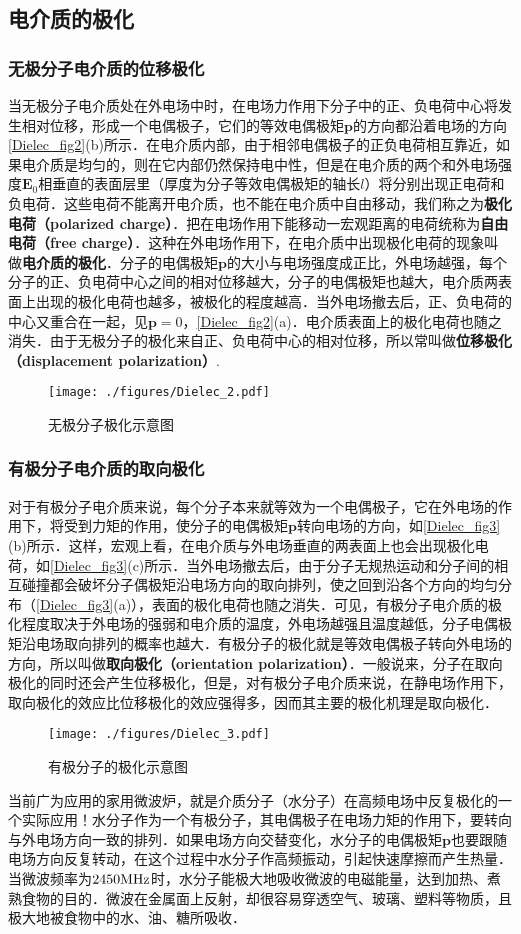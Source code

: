 \subsection{电介质的极化}

\subsubsection{无极分子电介质的位移极化}

当无极分子电介质处在外电场中时，在电场力作用下分子中的正、负电荷中心将发生相对位移，形成一个电偶极子，它们的等效电偶极矩$\mathbf p$的方向都沿着电场的方向\autoref{Dielec_fig2}(b)所示．在电介质内部，由于相邻电偶极子的正负电荷相互靠近，如果电介质是均匀的，则在它内部仍然保持电中性，但是在电介质的两个和外电场强度$\mathbf E_0$相垂直的表面层里（厚度为分子等效电偶极矩的轴长$l$）将分别出现正电荷和负电荷．这些电荷不能离开电介质，也不能在电介质中自由移动，我们称之为\textbf{极化电荷（polarized charge）}．把在电场作用下能移动一宏观距离的电荷统称为\textbf{自由电荷（free charge）}．这种在外电场作用下，在电介质中出现极化电荷的现象叫做\textbf{电介质的极化}．分子的电偶极矩$\mathbf p $的大小与电场强度成正比，外电场越强，每个分子的正、负电荷中心之间的相对位移越大，分子的电偶极矩也越大，电介质两表面上出现的极化电荷也越多，被极化的程度越高．当外电场撤去后，正、负电荷的中心又重合在一起，见$\mathbf p=0$，\autoref{Dielec_fig2}(a)．电介质表面上的极化电荷也随之消失．由于无极分子的极化来自正、负电荷中心的相对位移，所以常叫做\textbf{位移极化（displacement polarization）}.
\begin{figure}[ht]
\centering
\texttt{[image: ./figures/Dielec\_2.pdf]}
\caption{无极分子极化示意图} \label{Dielec_fig2}
\end{figure}

\subsubsection{有极分子电介质的取向极化}

对于有极分子电介质来说，每个分子本来就等效为一个电偶极子，它在外电场的作用下，将受到力矩的作用，使分子的电偶极矩$\mathbf p$转向电场的方向，如\autoref{Dielec_fig3}(b)所示．这样，宏观上看，在电介质与外电场垂直的两表面上也会出现极化电荷，如\autoref{Dielec_fig3}(c)所示．当外电场撤去后，由于分子无规热运动和分子间的相互碰撞都会破坏分子偶极矩沿电场方向的取向排列，使之回到沿各个方向的均匀分布（\autoref{Dielec_fig3}(a)），表面的极化电荷也随之消失．可见，有极分子电介质的极化程度取决于外电场的强弱和电介质的温度，外电场越强且温度越低，分子电偶极矩沿电场取向排列的概率也越大．有极分子的极化就是等效电偶极子转向外电场的方向，所以叫做\textbf{取向极化（orientation polarization）}．一般说来，分子在取向极化的同时还会产生位移极化，但是，对有极分子电介质来说，在静电场作用下，取向极化的效应比位移极化的效应强得多，因而其主要的极化机理是取向极化．
\begin{figure}[ht]
\centering
\texttt{[image: ./figures/Dielec\_3.pdf]}
\caption{有极分子的极化示意图} \label{Dielec_fig3}
\end{figure}

当前广为应用的家用微波炉，就是介质分子（水分子）在高频电场中反复极化的一个实际应用！水分子作为一个有极分子，其电偶极子在电场力矩的作用下，要转向与外电场方向一致的排列．如果电场方向交替变化，水分子的电偶极矩$\mathbf p$也要跟随电场方向反复转动，在这个过程中水分子作高频振动，引起快速摩擦而产生热量．当微波频率为$2450\rm  MHz$时，水分子能极大地吸收微波的电磁能量，达到加热、煮熟食物的目的．微波在金属面上反射，却很容易穿透空气、玻璃、塑料等物质，且极大地被食物中的水、油、糖所吸收．
